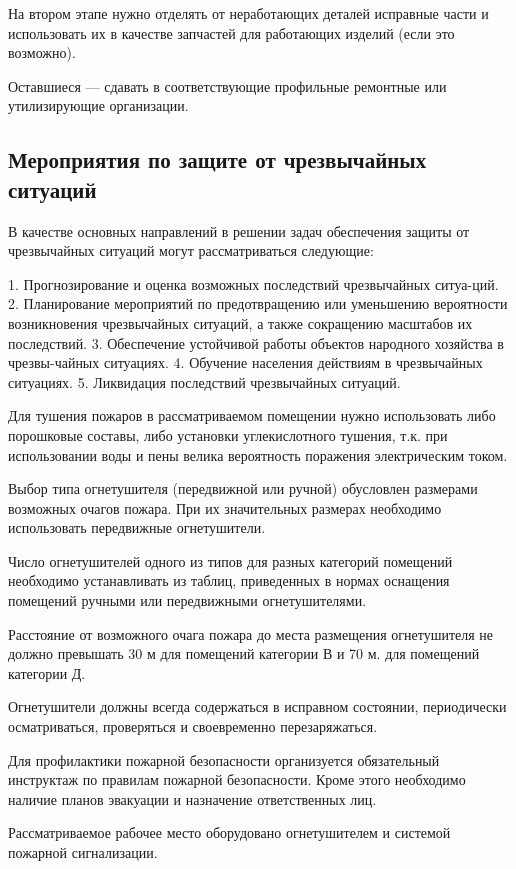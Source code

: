 На втором этапе нужно отделять от неработающих деталей исправные части и использовать их в качестве запчастей для работающих изделий (если это возможно).

Оставшиеся --- сдавать в соответствующие профильные ремонтные или утилизирующие организации.

\subsection{Мероприятия по защите от чрезвычайных ситуаций}

В качестве основных направлений в решении задач обеспечения защиты от чрезвычайных ситуаций могут рассматриваться следующие:

1.	Прогнозирование и оценка возможных последствий чрезвычайных ситуа-ций.
2.	Планирование мероприятий по предотвращению или уменьшению вероятности возникновения чрезвычайных ситуаций, а также сокращению масштабов их последствий.
3.	Обеспечение устойчивой работы объектов народного хозяйства в чрезвы-чайных ситуациях.
4.	Обучение населения действиям в чрезвычайных ситуациях.
5.	Ликвидация последствий чрезвычайных ситуаций.

Для тушения пожаров в рассматриваемом помещении нужно использовать либо порошковые составы, либо установки углекислотного тушения, т.к. при использовании воды и пены велика вероятность поражения электрическим током.

Выбор типа огнетушителя (передвижной или ручной) обусловлен размерами возможных очагов пожара. При их значительных размерах необходимо использовать передвижные огнетушители.

Число огнетушителей одного из типов для разных категорий помещений необходимо устанавливать из таблиц, приведенных в нормах оснащения помещений ручными или передвижными огнетушителями.

Расстояние от возможного очага пожара до места размещения огнетушителя не должно превышать 30 м для помещений категории В и 70 м. для помещений категории Д.

Огнетушители должны всегда содержаться в исправном состоянии, периодически осматриваться, проверяться и своевременно перезаряжаться.

Для профилактики пожарной безопасности организуется обязательный инструктаж по правилам пожарной безопасности. Кроме этого необходимо наличие планов эвакуации и назначение ответственных лиц.

Рассматриваемое рабочее место оборудовано огнетушителем и системой пожарной сигнализации.

